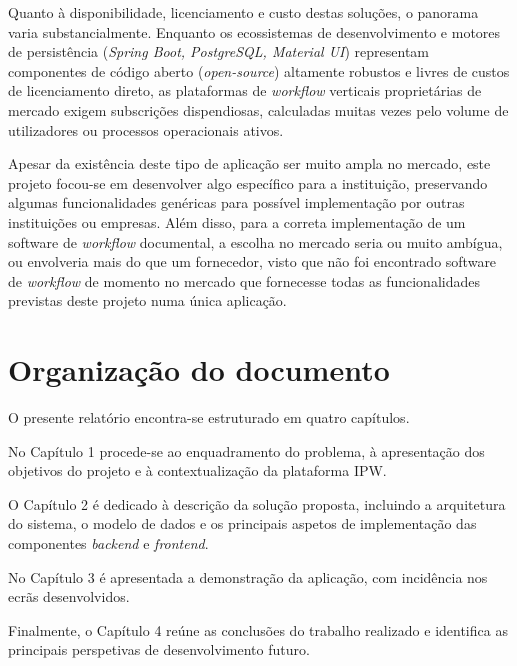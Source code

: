 Quanto à disponibilidade, licenciamento e custo destas soluções, o panorama varia substancialmente. Enquanto os ecossistemas de desenvolvimento e motores de persistência (\textit{Spring Boot, PostgreSQL, Material UI}) representam componentes de código aberto (\textit{open-source}) altamente robustos e livres de custos de licenciamento direto, as plataformas de \textit{workflow} verticais proprietárias de mercado exigem subscrições dispendiosas, calculadas muitas vezes pelo volume de utilizadores ou processos operacionais ativos.

Apesar da existência deste tipo de aplicação ser muito ampla no mercado, este projeto focou-se em desenvolver algo específico para a instituição, preservando algumas funcionalidades genéricas para possível implementação por outras instituições ou empresas. Além disso, para a correta implementação de um software de \textit{workflow} documental, a escolha no mercado seria ou muito ambígua, ou envolveria mais do que um fornecedor, visto que não foi encontrado software de \textit{workflow} de momento no mercado que fornecesse todas as funcionalidades previstas deste projeto numa única aplicação.
\section{Organização do documento}
O presente relatório encontra-se estruturado em quatro capítulos. 

No Capítulo 1 procede-se ao enquadramento do problema, à apresentação dos objetivos do projeto e à contextualização da plataforma IPW. 

O Capítulo 2 é dedicado à descrição da solução proposta, incluindo a arquitetura do sistema, o modelo de dados e os principais aspetos de implementação das componentes \textit{backend} e \textit{frontend}. 

No Capítulo 3 é apresentada a demonstração da aplicação, com incidência nos ecrãs desenvolvidos. 

Finalmente, o Capítulo 4 reúne as conclusões do trabalho realizado e identifica as principais perspetivas de desenvolvimento futuro.

